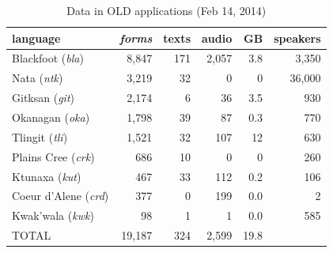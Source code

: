 \documentclass{beamer}
\begin{document}
\begin{frame}

\begin{table}[h]
 \begin{center}
     \scriptsize
\begin{tabular}{lrrrrr}

      \toprule
      language &                     \emph{forms}  & texts & audio & GB   & speakers \\
      \midrule
      Blackfoot (\textit{bla}) &     8,847  & 171   & 2,057 & 3.8  & 3,350    \\ %
      Nata (\textit{ntk}) &          3,219  & 32    & 0     & 0    & 36,000   \\ %
      Gitksan (\textit{git}) &       2,174  & 6     & 36    & 3.5  & 930      \\ %
      Okanagan (\textit{oka}) &      1,798  & 39    & 87    & 0.3  & 770      \\ %
      Tlingit (\textit{tli}) &       1,521  & 32    & 107   & 12   & 630      \\ %
      Plains Cree (\textit{crk}) &   686    & 10    & 0     & 0    & 260      \\ %
      Ktunaxa (\textit{kut}) &       467    & 33    & 112   & 0.2  & 106      \\ %
      Coeur d'Alene (\textit{crd}) & 377    & 0     & 199   & 0.0  & 2        \\ %
      Kwak'wala (\textit{kwk}) &     98     & 1     & 1     & 0.0  & 585      \\ %
      TOTAL &                        19,187 & 324   & 2,599 & 19.8 &         \\ %
      \bottomrule

\end{tabular}
\caption{Data in OLD applications (Feb 14, 2014)}
\label{old-data}
 \end{center}
 \normalsize
\end{table}


\end{frame}

%
\end{document}
